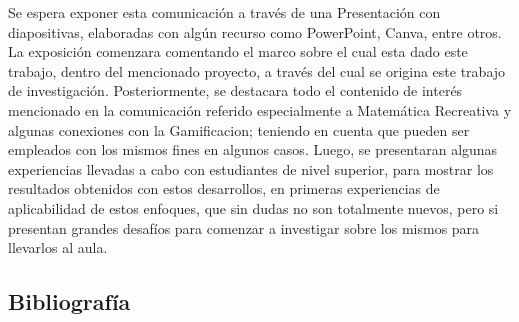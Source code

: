 Se espera exponer esta comunicación a través de una Presentación con diapositivas, elaboradas con algún recurso como PowerPoint, Canva, entre otros. La exposición comenzara comentando el marco sobre el cual esta dado este trabajo, dentro del mencionado proyecto, a través del cual se origina este trabajo de investigación. Posteriormente, se destacara todo el contenido de interés mencionado en la comunicación referido especialmente a Matemática Recreativa y algunas conexiones con la Gamificacion; teniendo en cuenta que pueden ser empleados con los mismos fines en algunos casos. Luego, se presentaran algunas experiencias llevadas a cabo con estudiantes de nivel superior, para mostrar los resultados obtenidos con estos desarrollos, en primeras experiencias de aplicabilidad de estos enfoques, que sin dudas no son totalmente nuevos, pero si presentan grandes desafíos para comenzar a investigar sobre los mismos para llevarlos al aula.

\subsection{Bibliografía}

\nocite{*}
\printbibliography[keyword={10}]